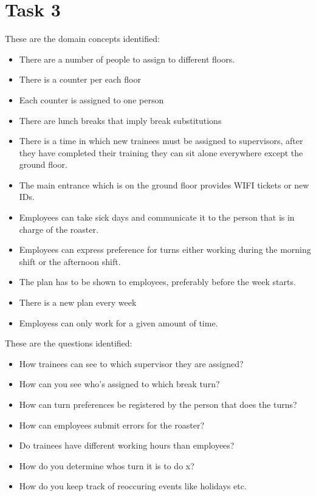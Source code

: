 \chapter{Task 3}
\begin{elenco}
	\item These are the domain concepts identified:
	\begin{itemize}
		\item There are a number of people to assign to different floors.
		\item There is a counter per each floor
		\item Each counter is assigned to one person
		\item There are lunch breaks that imply break substitutions 
		\item There is a time in which new trainees must be assigned to supervisors, after they have completed their training they can sit alone everywhere except the ground floor.
		\item The main entrance which is on the ground floor provides WIFI tickets or new IDs.
		\item Employees can take sick days and communicate it to the person that is in charge of the roaster.
		\item Employees can express preference for turns either working during the morning shift or the afternoon shift. 
		\item The plan has to be shown to employees, preferably before the week starts. 
		\item There is a new plan every week
		\item Employess can only work for a given amount of time.
	\end{itemize}
	\item These are the questions identified:
	\begin{itemize}
		\item How trainees can see to which supervisor they are assigned?
		\item How can you see who's assigned to which break turn?
		\item How can turn preferences be registered by the person that does the turns?
		\item How can employees submit errors for the roaster?
		\item Do trainees have different working hours than employees?
		\item How do you determine whos turn it is to do x?
		\item How do you keep track of reoccuring events like holidays etc.

\end{itemize}
\end{elenco}
